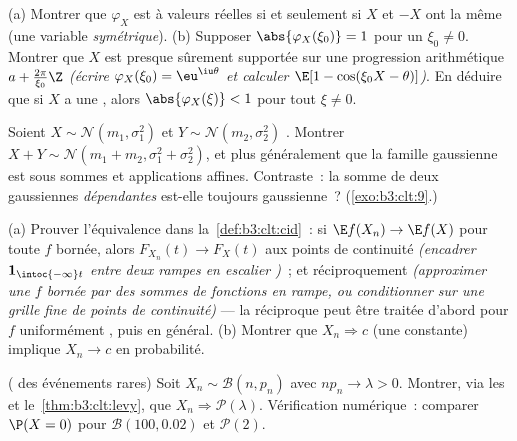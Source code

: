 \begin{exercise}[$\star\star$]\label{exo:b3:clt:2}
(a) Montrer que $\varphi_X$ est à valeurs réelles si et
seulement si $X$ et $-X$ ont la même  (une variable
\emph{symétrique}).
(b) Supposer $\abs{\varphi_X(\xi_0)} = 1$ pour un $\xi_0
\neq 0$. Montrer que $X$ est presque sûrement supportée sur
une progression arithmétique $a + \frac{2\pi}{\xi_0}\Z$
\emph{(écrire $\varphi_X(\xi_0) = \eu^{\iu\theta}$ et
calculer $\E[1 - \cos(\xi_0X - \theta)]$)}. En déduire que
si $X$ a une , alors $\abs{\varphi_X(\xi)} < 1$ pour
tout $\xi \neq 0$.
\end{exercise}

\begin{exercise}[$\star\star$]\label{exo:b3:clt:3}
Soient $X \sim \mathcal N(m_1, \sigma_1^2)$ et $Y \sim
\mathcal N(m_2, \sigma_2^2)$ . Montrer $X + Y
\sim \mathcal N(m_1 + m_2, \sigma_1^2 + \sigma_2^2)$, et
plus généralement que la famille gaussienne est  sous
sommes  et applications affines. Contraste~: la
somme de deux gaussiennes \emph{dépendantes} est-elle
toujours gaussienne~? (\cref{exo:b3:clt:9}.)
\end{exercise}

\begin{exercise}[$\star\star$]\label{exo:b3:clt:4}
(a) Prouver l'équivalence dans
la~\cref{def:b3:clt:cid}~: si $\E f(X_n) \to \E f(X)$ pour
toute $f$  bornée, alors $F_{X_n}(t) \to F_X(t)$
aux points de continuité \emph{(encadrer $\mathbf
1_{\intoc{-\infty}t}$ entre deux rampes en escalier
)}~; et réciproquement \emph{(approximer une $f$
 bornée par des sommes de fonctions en rampe, ou
conditionner sur une grille fine de points de continuité)}
--- la réciproque peut être traitée d'abord pour $f$
uniformément , puis en général.
(b) Montrer que $X_n \Rightarrow c$ (une constante) implique
$X_n \to c$ en probabilité.
\end{exercise}

\begin{exercise}[$\star\star$]\label{exo:b3:clt:5}
( des événements rares) Soit $X_n \sim \mathcal B(n,
p_n)$ avec $np_n \to \lambda > 0$. Montrer, via les
 et le~\cref{thm:b3:clt:levy},
que $X_n \Rightarrow \mathcal P(\lambda)$. Vérification
numérique~: comparer $\P(X = 0)$ pour $\mathcal B(100,
0.02)$ et $\mathcal P(2)$.
\end{exercise}

